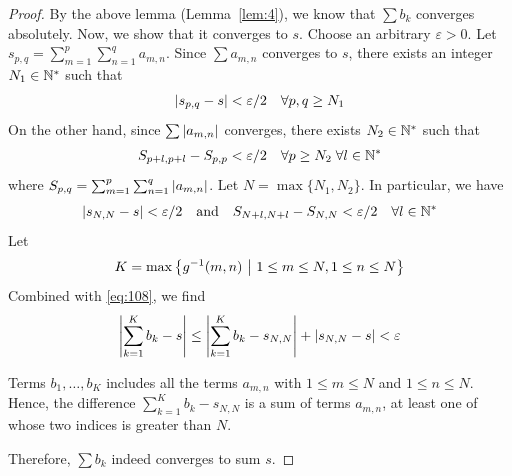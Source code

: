 \documentclass[thmcnt=section, 12pt]{my-elegantbook}
\begin{document}
\begin{proof}
    By the above lemma (Lemma~\ref{lem:4}), we know that $\sum b_k$ converges absolutely. Now, we show that it converges to $s$. Choose an arbitrary $\varepsilon > 0$. Let $s_{p,q} = \sum_{m=1}^{p} \sum_{n=1}^{q} a_{m,n}$. Since $\sum a_{m,n}$ converges to $s$, there exists an integer $N_1 \in \mathbb{N}^\ast$ such that
    \begin{align*}
        \left\lvert s_{p,q} - s \right\rvert < \varepsilon / 2
        \quad
        \forall p,q \geq N_1
    \end{align*}
    On the other hand, since $\sum \left\lvert a_{m,n} \right\rvert$ converges, there exists $N_2 \in \mathbb{N}^\ast$ such that
    \begin{align*}
        S_{p+l, p+l} - S_{p,p} < \varepsilon / 2
        \quad
        \forall p \geq N_2 \;
        \forall l \in \mathbb{N}^\ast
    \end{align*}
    where $S_{p,q} = \sum_{m=1}^{p} \sum_{n=1}^{q} \left\lvert a_{m,n} \right\rvert$. Let $N = \max\{N_1, N_2\}$. In particular, we have
    \begin{align}
        \left\lvert s_{N,N} - s \right\rvert < \varepsilon / 2
        \quad \text{and} \quad
        S_{N+l,N+l} - S_{N,N} < \varepsilon / 2
        \quad \forall l \in \mathbb{N}^\ast
        \label{eq:108}
    \end{align}
    Let
    \begin{align*}
        K = \max \left\{ g^{-1}(m,n) \ \middle| \ 1 \leq m \leq N, 1 \leq n \leq N \right\}
    \end{align*}
    Combined with \eqref{eq:108}, we find
    \begin{align*}
        \left\lvert \sum_{k=1}^K b_k - s \right\rvert
        \leq \left\lvert \sum_{k=1}^K b_k - s_{N,N} \right\rvert
        + \left\lvert s_{N,N} - s \right\rvert
        < \varepsilon
    \end{align*}
    \begin{note}
        Terms $b_1, \ldots, b_K$ includes all the terms $a_{m,n}$ with $1 \leq m \leq N$ and $1 \leq n \leq N$. Hence, the difference $\sum_{k=1}^K b_k - s_{N, N}$ is a sum of terms $a_{m,n}$, at least one of whose two indices is greater than $N$.
    \end{note}

    \noindent Therefore, $\sum b_k$ indeed converges to sum $s$.


\end{proof}
\end{document}
